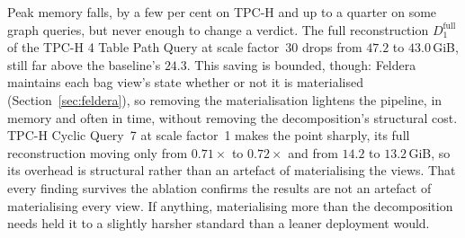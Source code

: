 Peak memory falls, by a few per cent on TPC-H and up to a quarter on some graph queries, but never enough to change a verdict. The full reconstruction $D_1^{\text{full}}$ of the TPC-H 4 Table Path Query at scale factor~30 drops from $47.2$ to $43.0$\,GiB, still far above the baseline's $24.3$. This saving is bounded, though: Feldera maintains each bag view's state whether or not it is materialised (Section~\ref{sec:feldera}), so removing the materialisation lightens the pipeline, in memory and often in time, without removing the decomposition's structural cost. TPC-H Cyclic Query~7 at scale factor~1 makes the point sharply, its full reconstruction moving only from $0.71\times$ to $0.72\times$ and from $14.2$ to $13.2$\,GiB, so its overhead is structural rather than an artefact of materialising the views. That every finding survives the ablation confirms the results are not an artefact of materialising every view. If anything, materialising more than the decomposition needs held it to a slightly harsher standard than a leaner deployment would.


